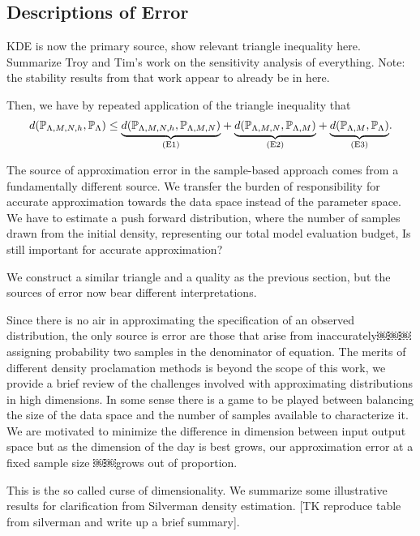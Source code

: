 \subsection{Descriptions of Error}\label{sec:sample-error}

KDE is now the primary source, show relevant triangle inequality here.
Summarize Troy and Tim's work on the sensitivity analysis of everything.
Note: the stability results from that work appear to already be in here.

Then, we have by repeated application of the triangle inequality that
\begin{equation}
\label{eq:sample-triangleineq}
d(\mathbb{P}_{{\Lambda}, M, N, h}, \mathbb{P}_{\Lambda}) \leq
\underset{ \text{(E1)} }{\underbrace{d(\mathbb{P}_{{\Lambda}, M, N, h},\mathbb{P}_{{\Lambda}, M, N})}} +
\underset{ \text{(E2)} }{\underbrace{d(\mathbb{P}_{{\Lambda}, M, N}, \mathbb{P}_{{\Lambda}, M}) }}+
\underset{ \text{(E3)} }{\underbrace{d(\mathbb{P}_{{\Lambda}, M}, \mathbb{P}_{\Lambda}) }}.
\end{equation}

The source of approximation error in the sample-based approach comes from a fundamentally different source.
We transfer the burden of responsibility for accurate approximation towards the data space instead of the parameter space.
We have to estimate a push forward distribution, where the number of samples drawn from the initial density, representing our total model evaluation budget,
Is still important for accurate approximation?

We construct a similar triangle and a quality as the previous section, but the sources of error now bear different interpretations.

Since there is no air in approximating the specification of an observed distribution, the only source is error are those that arise from inaccurately￼￼￼ assigning probability two samples in the denominator of equation.
The merits of different density proclamation methods is beyond the scope of this work, we provide a brief review of the challenges involved with approximating distributions in high dimensions.
In some sense there is a game to be played between balancing the size of the data space and the number of samples available to characterize it.
We are motivated to minimize the difference in dimension between input output space but as the dimension of the day is best grows, our approximation error at a fixed sample size ￼￼grows out of proportion.

This is the so called curse of dimensionality.
We summarize some illustrative results for clarification from Silverman density estimation.
[TK reproduce table from silverman and write up a brief summary].
